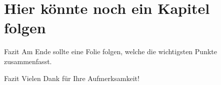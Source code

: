 \section{Hier könnte noch ein Kapitel folgen}
\begin{frame}{Fazit}
    Am Ende sollte eine Folie folgen, welche die wichtigsten Punkte zusammenfasst.
\end{frame}


\begin{frame}{Fazit}
    \Large \centering \textcolor{luhblau}{Vielen Dank für Ihre Aufmerksamkeit!}
\end{frame}